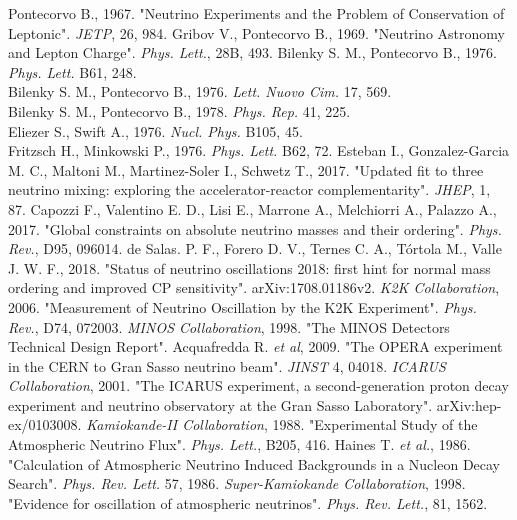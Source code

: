 \documentclass[english]{article}
\begin{document}
\begin{thebibliography}{99}
    Pontecorvo B., 1967. "Neutrino Experiments and the Problem of Conservation of Leptonic". \textit{JETP}, 26, 984.
    Gribov V., Pontecorvo B., 1969. "Neutrino Astronomy and Lepton Charge". \textit{Phys. Lett.}, 28B, 493.
    Bilenky S. M., Pontecorvo B., 1976. \textit{Phys. Lett.} B61, 248.\\
    Bilenky S. M., Pontecorvo B., 1976. \textit{Lett. Nuovo Cim.} 17, 569.\\ 
    Bilenky S. M., Pontecorvo B., 1978. \textit{Phys. Rep.} 41, 225.\\
    Eliezer S., Swift A., 1976. \textit{Nucl. Phys.} B105, 45.\\
    Fritzsch H., Minkowski P., 1976. \textit{Phys. Lett.} B62, 72.
    Esteban I., Gonzalez-Garcia M. C., Maltoni M., Martinez-Soler I., Schwetz T., 2017. "Updated fit to three neutrino mixing: exploring the accelerator-reactor complementarity". \textit{JHEP}, 1, 87.
    Capozzi F., Valentino E. D., Lisi E., Marrone A., Melchiorri A., Palazzo A., 2017. "Global constraints on absolute neutrino masses and their ordering". \textit{Phys. Rev.}, D95, 096014.
    de Salas. P. F., Forero D. V., Ternes C. A., Tórtola M., Valle J. W. F., 2018. "Status of neutrino oscillations 2018: first hint for normal mass ordering and improved CP sensitivity". arXiv:1708.01186v2.
    \textit{K2K Collaboration}, 2006. "Measurement of Neutrino Oscillation by the K2K Experiment". \textit{Phys. Rev.}, D74, 072003.
    \textit{MINOS Collaboration}, 1998. "The MINOS Detectors Technical Design Report".
     Acquafredda R. \textit{et al}, 2009. "The OPERA experiment in the CERN to Gran Sasso neutrino beam". \textit{JINST} 4, 04018.
    \textit{ICARUS Collaboration}, 2001. "The ICARUS experiment, a second-generation proton decay experiment and neutrino observatory at the Gran Sasso Laboratory". arXiv:hep-ex/0103008.
    \textit{Kamiokande-II Collaboration}, 1988. "Experimental Study of the Atmospheric Neutrino Flux". \textit{Phys. Lett.}, B205, 416.
    Haines T. \textit{et al.}, 1986. "Calculation of Atmospheric Neutrino Induced Backgrounds in a Nucleon Decay Search". \textit{Phys. Rev. Lett.} 57, 1986.
    \textit{Super-Kamiokande Collaboration}, 1998. "Evidence for oscillation of atmospheric neutrinos". \textit{Phys. Rev. Lett.}, 81, 1562.

\end{thebibliography}
\end{document}
